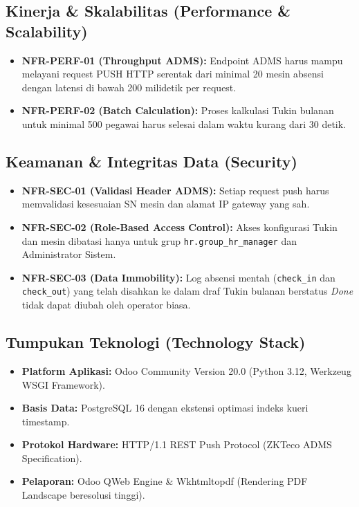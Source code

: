\documentclass[12pt,a4paper]{article}
\begin{document}
\subsection{Kinerja \& Skalabilitas (Performance \& Scalability)}
\begin{itemize}
    \item \textbf{NFR-PERF-01 (Throughput ADMS):} Endpoint ADMS harus mampu melayani request PUSH HTTP serentak dari minimal 20 mesin absensi dengan latensi di bawah 200 milidetik per request.
    \item \textbf{NFR-PERF-02 (Batch Calculation):} Proses kalkulasi Tukin bulanan untuk minimal 500 pegawai harus selesai dalam waktu kurang dari 30 detik.
\end{itemize}

\subsection{Keamanan \& Integritas Data (Security)}
\begin{itemize}
    \item \textbf{NFR-SEC-01 (Validasi Header ADMS):} Setiap request push harus memvalidasi kesesuaian SN mesin dan alamat IP gateway yang sah.
    \item \textbf{NFR-SEC-02 (Role-Based Access Control):} Akses konfigurasi Tukin dan mesin dibatasi hanya untuk grup \texttt{hr.group\_hr\_manager} dan Administrator Sistem.
    \item \textbf{NFR-SEC-03 (Data Immobility):} Log absensi mentah (\texttt{check\_in} dan \texttt{check\_out}) yang telah disahkan ke dalam draf Tukin bulanan berstatus \textit{Done} tidak dapat diubah oleh operator biasa.
\end{itemize}

\subsection{Tumpukan Teknologi (Technology Stack)}
\begin{itemize}
    \item \textbf{Platform Aplikasi:} Odoo Community Version 20.0 (Python 3.12, Werkzeug WSGI Framework).
    \item \textbf{Basis Data:} PostgreSQL 16 dengan ekstensi optimasi indeks kueri timestamp.
    \item \textbf{Protokol Hardware:} HTTP/1.1 REST Push Protocol (ZKTeco ADMS Specification).
    \item \textbf{Pelaporan:} Odoo QWeb Engine \& Wkhtmltopdf (Rendering PDF Landscape beresolusi tinggi).
\end{itemize}
\end{document}
